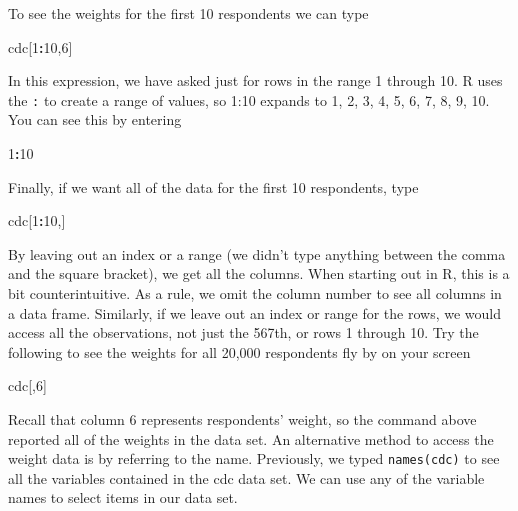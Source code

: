 \documentclass[]{book}
\newenvironment{Shaded}{\begin{snugshade}}{\end{snugshade}}
\newcommand{\DecValTok}[1]{\textcolor[rgb]{0.00,0.00,0.81}{#1}}
\newcommand{\NormalTok}[1]{#1}
\newcommand{\OperatorTok}[1]{\textcolor[rgb]{0.81,0.36,0.00}{\textbf{#1}}}
\theoremstyle{definition}
\theoremstyle{definition}
\theoremstyle{definition}
\theoremstyle{remark}
\begin{document}
To see the weights for the first 10 respondents we can type

\begin{Shaded}
\begin{Highlighting}[]
\NormalTok{cdc[}\DecValTok{1}\OperatorTok{:}\DecValTok{10}\NormalTok{,}\DecValTok{6}\NormalTok{]}
\end{Highlighting}
\end{Shaded}

In this expression, we have asked just for rows in the range 1 through
10. R uses the \texttt{:} to create a range of values, so 1:10 expands
to 1, 2, 3, 4, 5, 6, 7, 8, 9, 10. You can see this by entering

\begin{Shaded}
\begin{Highlighting}[]
\DecValTok{1}\OperatorTok{:}\DecValTok{10}
\end{Highlighting}
\end{Shaded}

Finally, if we want all of the data for the first 10 respondents, type

\begin{Shaded}
\begin{Highlighting}[]
\NormalTok{cdc[}\DecValTok{1}\OperatorTok{:}\DecValTok{10}\NormalTok{,]}
\end{Highlighting}
\end{Shaded}

By leaving out an index or a range (we didn't type anything between the
comma and the square bracket), we get all the columns. When starting out
in R, this is a bit counterintuitive. As a rule, we omit the column
number to see all columns in a data frame. Similarly, if we leave out an
index or range for the rows, we would access all the observations, not
just the 567th, or rows 1 through 10. Try the following to see the
weights for all 20,000 respondents fly by on your screen

\begin{Shaded}
\begin{Highlighting}[]
\NormalTok{cdc[,}\DecValTok{6}\NormalTok{]}
\end{Highlighting}
\end{Shaded}

Recall that column 6 represents respondents' weight, so the command
above reported all of the weights in the data set. An alternative method
to access the weight data is by referring to the name. Previously, we
typed \texttt{names(cdc)} to see all the variables contained in the cdc
data set. We can use any of the variable names to select items in our
data set.
\end{document}

